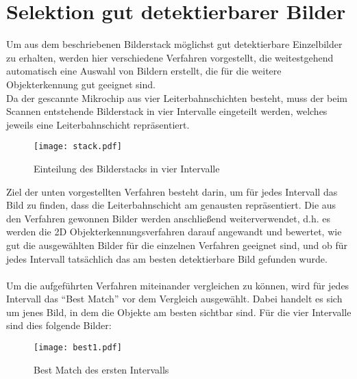 
\chapter{Selektion gut detektierbarer Bilder}
\label{chap:slk}
	Um aus dem beschriebenen Bilderstack möglichst gut detektierbare Einzelbilder zu erhalten, werden hier verschiedene Verfahren vorgestellt, die weitestgehend automatisch eine Auswahl von Bildern erstellt, die für die weitere Objekterkennung gut geeignet sind. \\
Da der gescannte Mikrochip aus vier Leiterbahnschichten besteht, muss der beim Scannen entstehende Bilderstack in vier Intervalle eingeteilt werden, welches jeweils eine Leiterbahnschicht repräsentiert. 
\begin{figure}[H]
  \begin{center}
    \texttt{[image: stack.pdf]}
    \caption{Einteilung des Bilderstacks in vier Intervalle}
    \label{fig:intervalls}
  \end{center}
\end{figure}
Ziel der unten vorgestellten Verfahren besteht darin, um für jedes Intervall das Bild zu finden, dass die Leiterbahnschicht am genausten repräsentiert.
Die aus den Verfahren gewonnen Bilder werden anschließend weiterverwendet, d.h. es werden die 2D Objekterkennungsverfahren darauf angewandt und bewertet, wie gut die ausgewählten Bilder für die einzelnen Verfahren geeignet sind, und ob für jedes Intervall tatsächlich das am besten detektierbare Bild gefunden wurde.\\ \\

Um die aufgeführten Verfahren miteinander vergleichen zu können, wird für jedes Intervall das "`Best Match"' vor dem Vergleich ausgewählt. Dabei handelt es sich um jenes Bild, in dem die Objekte am besten sichtbar sind. Für die vier Intervalle sind dies folgende Bilder:

\begin{figure}[H]
  \begin{center}
    \texttt{[image: best1.pdf]}
    \caption{Best Match des ersten Intervalls}
    \label{fig:bestmatch1}
  \end{center}
\end{figure}

